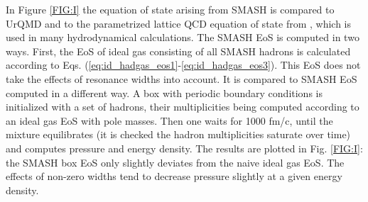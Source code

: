 In Figure \ref{FIG:I} the equation of state arising from SMASH is compared to UrQMD
and to the parametrized lattice QCD equation of state from \cite{Huovinen:2009yb},
which is used in many hydrodynamical calculations. The SMASH EoS is computed in two
ways. First, the EoS of ideal gas consisting of all SMASH hadrons is calculated
according to Eqs. (\ref{eq:id_hadgas_eos1}-\ref{eq:id_hadgas_eos3}). This EoS does not
take the effects of resonance widths into account. It is compared to SMASH EoS
computed in a different way. A box with periodic boundary conditions is initialized
with a set of hadrons, their multiplicities being computed according to an ideal gas
EoS with pole masses. Then one waits for 1000 fm/c, until the mixture equilibrates (it
is checked the hadron multiplicities saturate over time) and computes
pressure and energy density. The results are plotted in Fig. \ref{FIG:I}: the SMASH
box EoS only slightly deviates from the naive ideal gas EoS. The effects of non-zero
widths tend to decrease pressure slightly at a given energy density.